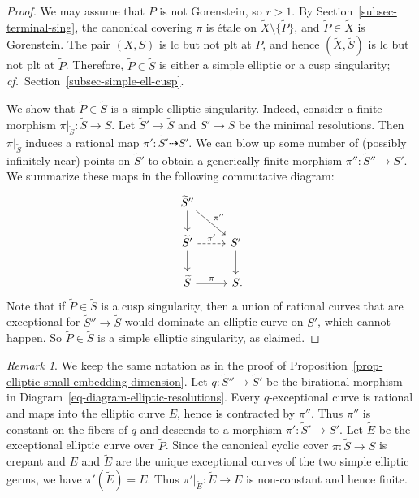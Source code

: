 \documentclass[11pt]{amsart}
\numberwithin{equation}{section}
\theoremstyle{definition}
\theoremstyle{remark}
\newtheorem{remark}[thm]{Remark}
\begin{document}
\begin{proof}
  We may assume that $P$ is not Gorenstein, so $r>1$.
By Section~\ref{subsec-terminal-sing}, the canonical covering $\pi$ is \'etale on $\widetilde{X}\setminus\{\widetilde P\}$, and $\widetilde{P}\in\widetilde{X}$ is Gorenstein. The pair $(X, S)$ is lc but not plt at $P$, and hence $(\widetilde{X}, \widetilde{S})$ is lc but not plt at $\widetilde{P}$. Therefore, $\widetilde{P}\in\widetilde{S}$ is either a simple elliptic or a cusp singularity; \textit{cf.}~Section~\ref{subsec-simple-ell-cusp}. 

We show that $\widetilde{P}\in\widetilde{S}$ is a simple elliptic singularity. Indeed, consider a finite morphism $\pi|_{\widetilde{S}}\colon \widetilde{S}\to S$. Let $\widetilde{S}'\to \widetilde{S}$ and $S'\to S$ be the minimal resolutions. Then $\pi|_{\widetilde{S}}$ induces a rational map $\pi'\colon \widetilde{S}'\dashrightarrow S'$. We can blow up some number of (possibly infinitely near) points on $\widetilde{S}'$ to obtain a generically finite morphism $\pi''\colon \widetilde{S}''\to S'$. We summarize these maps in the following commutative diagram: 
\begin{equation}
\label{eq-diagram-elliptic-resolutions}
\begin{tikzcd}
\widetilde{S}'' \arrow{d}{} \arrow{dr}{\pi''} & \\
\widetilde{S}' \arrow[dashed]{r}{\pi'} \arrow[swap]{d}{} &  S' \arrow{d}{} \\
\widetilde{S} \arrow{r}{\pi}  & S\rlap{.}
\end{tikzcd}
\end{equation}
Note that if $\widetilde{P}\in \widetilde{S}$ is a cusp singularity, then a union of rational curves that are exceptional for $\widetilde{S}''\to \widetilde{S}$ would dominate an elliptic curve on $S'$, which cannot happen. So $\widetilde{P}\in \widetilde{S}$ is a simple elliptic singularity, as claimed. 
\end{proof}

\begin{remark}
\label{rem-map-elliptic-morphism}
We keep the same notation as in the proof of Proposition~\ref{prop-elliptic-small-embedding-dimension}. 
Let $q\colon\widetilde S''\to\widetilde S'$ be the birational morphism in Diagram~\eqref{eq-diagram-elliptic-resolutions}. Every $q$-exceptional curve is rational and maps into the elliptic curve $E$, hence is contracted by $\pi''$. Thus $\pi''$ is constant on the fibers of $q$ and descends to a morphism $\pi'\colon\widetilde S'\to S'$. Let $\widetilde E$ be the exceptional elliptic curve over $\widetilde P$. Since the canonical cyclic cover $\pi\colon\widetilde S\to S$ is crepant and $E$ and $\widetilde E$ are the unique exceptional curves of the two simple elliptic germs, we have $\pi'(\widetilde E)=E$. Thus $\pi'|_{\widetilde E}\colon\widetilde E\to E$ is non-constant and hence finite.
\end{remark}
\end{document}
